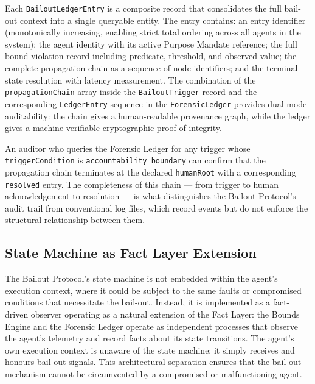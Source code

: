 Each \texttt{BailoutLedgerEntry} is a composite record that consolidates the full bail-out context into a single queryable entity. The entry contains: an entry identifier (monotonically increasing, enabling strict total ordering across all agents in the system); the agent identity with its active Purpose Mandate reference; the full bound violation record including predicate, threshold, and observed value; the complete propagation chain as a sequence of node identifiers; and the terminal state resolution with latency measurement. The combination of the \texttt{propagationChain} array inside the \texttt{BailoutTrigger} record and the corresponding \texttt{LedgerEntry} sequence in the \texttt{ForensicLedger} provides dual-mode auditability: the chain gives a human-readable provenance graph, while the ledger gives a machine-verifiable cryptographic proof of integrity.

An auditor who queries the Forensic Ledger for any trigger whose \texttt{triggerCondition} is \texttt{accountability\_boundary} can confirm that the propagation chain terminates at the declared \texttt{humanRoot} with a corresponding \texttt{resolved} entry. The completeness of this chain — from trigger to human acknowledgement to resolution — is what distinguishes the Bailout Protocol's audit trail from conventional log files, which record events but do not enforce the structural relationship between them.

\subsection{State Machine as Fact Layer Extension}
\label{sec:state-machine-extension}

The Bailout Protocol's state machine is not embedded within the agent's execution context, where it could be subject to the same faults or compromised conditions that necessitate the bail-out. Instead, it is implemented as a fact-driven observer operating as a natural extension of the Fact Layer: the Bounds Engine and the Forensic Ledger operate as independent processes that observe the agent's telemetry and record facts about its state transitions. The agent's own execution context is unaware of the state machine; it simply receives and honours bail-out signals. This architectural separation ensures that the bail-out mechanism cannot be circumvented by a compromised or malfunctioning agent.

